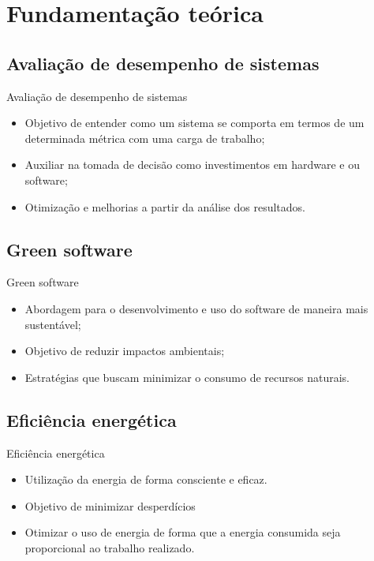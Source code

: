 \section{Fundamentação teórica}

\subsection{Avaliação de desempenho de sistemas}
\begin{frame}{Avaliação de desempenho de sistemas}
    \begin{itemize}
        \item Objetivo de entender como um sistema se comporta em termos de um determinada métrica com uma carga de trabalho;
        \item Auxiliar na tomada de decisão como investimentos em hardware e ou software;
        \item Otimização e melhorias a partir da análise dos resultados.
    \end{itemize}
\end{frame}

\subsection{Green software}
\begin{frame}{Green software}
    \begin{itemize}
        \item Abordagem para o desenvolvimento e uso do software de maneira mais sustentável;
        \item Objetivo de reduzir impactos ambientais;
        \item Estratégias que buscam minimizar o consumo de recursos naturais.

    \end{itemize}
\end{frame}

\subsection{Eficiência energética}
\begin{frame}{Eficiência energética}
    \begin{itemize}
        \item Utilização da energia de forma consciente e eficaz.
        \item Objetivo de minimizar desperdícios
        \item Otimizar o uso de energia de forma que a energia consumida seja proporcional ao trabalho realizado.
    \end{itemize}
\end{frame}

